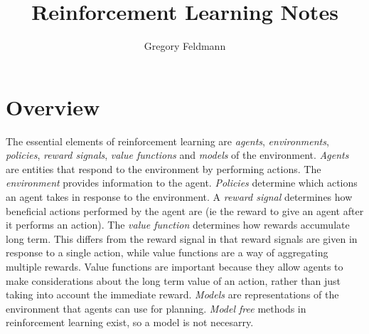 \documentclass[]{article}
\title{Reinforcement Learning Notes}
\author{Gregory Feldmann}
\begin{document}
\maketitle

\begin{abstract}

\end{abstract}

\section{Overview}
The essential elements of reinforcement learning are \textit{agents}, \textit{environments}, \textit{policies}, \textit{reward signals}, \textit{value functions} and \textit{models} of the environment. \textit{Agents} are entities that respond to the environment by performing actions. The \textit{environment} provides information to the agent. \textit{Policies} determine which actions an agent takes in response to the environment. A \textit{reward signal} determines how beneficial actions performed by the agent are (ie the reward to give an agent after it performs an action). The \textit{value function} determines how rewards accumulate long term. This differs from the reward signal in that reward signals are given in response to a single action, while value functions are a way of aggregating multiple rewards. Value functions are important because they allow agents to make considerations about the long term value of an action, rather than just taking into account the immediate reward. \textit{Models} are representations of the environment that agents can use for planning. \textit{Model free} methods in reinforcement learning exist, so a model is not necesarry.
\end{document}
